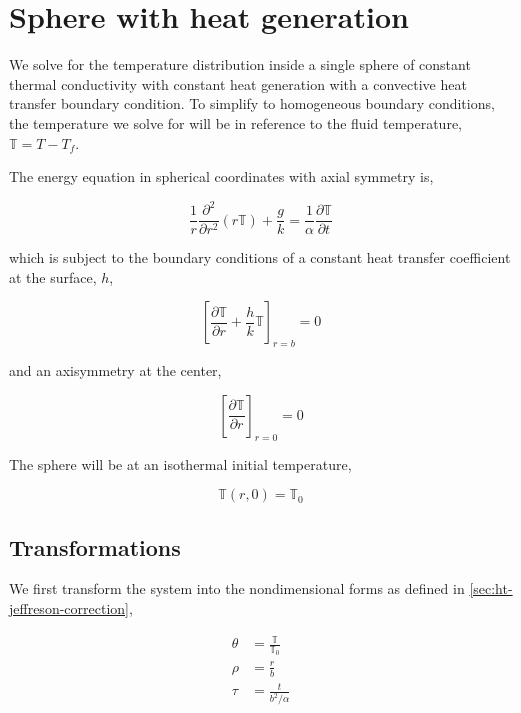 \chapter{Sphere with heat generation}\label{sec:analytic-sphere-details}

We solve for the temperature distribution inside a single sphere of constant thermal conductivity with constant heat generation with a convective heat transfer boundary condition. To simplify to homogeneous boundary conditions, the temperature we solve for will be in reference to the fluid temperature, $\mathbb{T} = T-T_f$. 

The energy equation in spherical coordinates with axial symmetry is,

\begin{equation}
    \frac{1}{r}\frac{\partial^2}{\partial r^2}(r\mathbb{T}) + \frac{g}{k} = \frac{1}{\alpha}\frac{\partial \mathbb{T}}{\partial t}
\end{equation}

which is subject to the boundary conditions of a constant heat transfer coefficient at the surface, $h$,

\begin{equation}
    \left[\frac{\partial \mathbb{T}}{\partial r} + \frac{h}{k}\mathbb{T}\right]_{r=b} = 0
\end{equation}

and an axisymmetry at the center,

\begin{equation}
    \left[\frac{\partial \mathbb{T}}{\partial r}\right]_{r=0} = 0
\end{equation}

The sphere will be at an isothermal initial temperature,

\begin{equation}
    \mathbb{T}(r,0) = \mathbb{T}_0
\end{equation}





\section{Transformations}

We first transform the system into the nondimensional forms as defined in \cref{sec:ht-jeffreson-correction},

\begin{align*}
    \theta &= \frac{\mathbb{T}}{\mathbb{T}_0}\\
    \rho & = \frac{r}{b}\\
    \tau & = \frac{t}{b^2/\alpha}
\end{align*}

